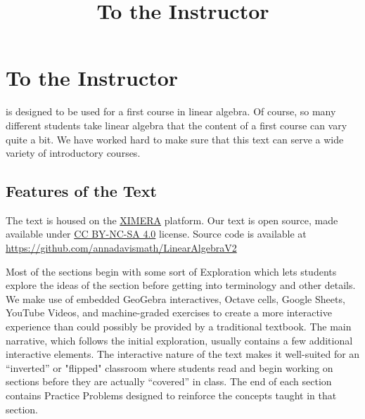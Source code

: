\documentclass{ximera}
\title{To the Instructor} \license{CC BY-NC-SA 4.0}
\begin{document}
\begin{abstract}
\end{abstract}
\maketitle

\section*{To the Instructor}
 is designed to be used for a first course in linear algebra.  Of course, so many different students take linear algebra that the content of a first course can vary quite a bit.  We have worked hard to make sure that this text can serve a wide variety of introductory courses. 

\subsection*{Features of the Text}

The text is housed on the \href{https://ximera.osu.edu/}{XIMERA} platform. %
Our text is open source, made available under \href{https://creativecommons.org/licenses/by-sa/4.0/deed.en}{CC BY-NC-SA 4.0} license.  Source code is available at \href{https://github.com/annadavismath/LinearAlgebraV2}{https://github.com/annadavismath/LinearAlgebraV2}

Most of the sections begin with some sort of Exploration which lets students explore the ideas of the section before getting into terminology and other details.  We make use of embedded GeoGebra interactives, Octave cells, Google Sheets, YouTube Videos, and machine-graded exercises to create a more interactive experience than could possibly be provided by a traditional textbook.  The main narrative, which follows the initial exploration, usually contains a few additional interactive elements.  The interactive nature of the text %
makes it well-suited for an ``inverted'' or "flipped" classroom where students read and begin working on sections before they are actually ``covered'' in class.  The end of each section contains Practice Problems designed to reinforce the concepts taught in that section.
\end{document}
